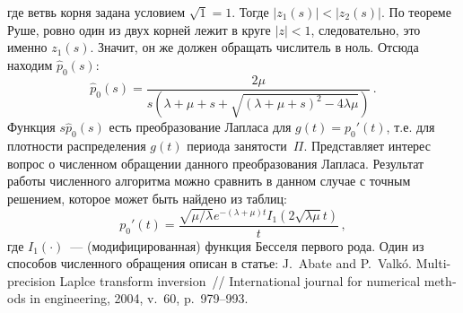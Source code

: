 \documentclass[12pt]{extarticle}
\begin{document}
где ветвь корня задана условием $\sqrt{1}=1$. Тогде $|z_1(s)|<|z_2(s)|$. По
теореме Руше, ровно один из двух корней лежит в круге $|z|<1$, следовательно,
это именно $z_1(s)$. Значит, он же должен обращать числитель в ноль. Отсюда
находим $\hat p_0(s)$:
\[
\hat
p_0(s)=\dfrac{2\mu}{s(\lambda+\mu+s+\sqrt{(\lambda+\mu+s)^2-4\lambda\mu})}\,. 
\]
Функция $s \hat p_0(s)$ есть преобразование Лапласа для $g(t)=p_0'(t)$, т.е. для
плотности распределения $g(t)$ периода занятости~$\Pi$. Представляет интерес
вопрос о численном обращении данного преобразования Лапласа. Результат работы
численного алгоритма можно сравнить в данном случае с точным решением, которое
может быть найдено из таблиц:
\[
p_0'(t)=\dfrac{\sqrt{\mu/\lambda} e^{-(\lambda+\mu)t}
  I_1(2\sqrt{\lambda\mu}t)}{t}\,,
\]
где $I_1(\cdot)$~--- (модифицированная) функция Бесселя первого рода. Один из
способов численного обращения описан в статье: \foreignlanguage{english}{J.~Abate and
P.~Valk\'o. Multi-precision Laplce transform inversion~// International journal
for numerical methods in engineering, 2004, v.~60, p.~979--993.}
\end{document}
